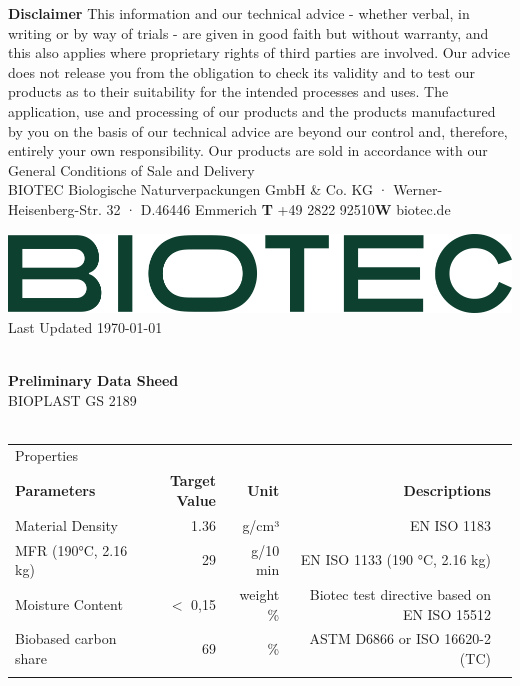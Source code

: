 \documentclass{article}
\begin{document}
\vspace*{\fill}
{\scriptsize
    \textbf{Disclaimer} This information and our technical advice - whether verbal, in writing or by way of trials - are given in good faith but without warranty, and this also applies where proprietary rights of third parties are involved. Our advice does not release you from the obligation to check its validity and to test our products as to their suitability for the intended processes and uses. The application, use and processing of our products and the products manufactured by you on the basis of our technical advice are beyond our control and, therefore, entirely your own responsibility. Our products are sold in accordance with our General Conditions of Sale and Delivery \\ 
 BIOTEC Biologische Naturverpackungen GmbH \& Co. KG · Werner-Heisenberg-Str. 32 · D.46446 Emmerich \hfill \textbf{T} +49 2822 92510\qquad \textbf{W} biotec.de}
\clearpage
\begin{flushleft}
\includegraphics[scale=0.20]{biotec}
\hfill\tiny Last Updated \today
\end{flushleft}
\begin{flushleft}
\hspace{1cm}\\
\textbf{Preliminary Data Sheed}\\
BIOPLAST GS 2189\\
\hspace{1cm}\\
\end{flushleft}
\begin{center}
\begin{tabularx}
{\textwidth}{X r  r  r  r }\rowcolor{color_title}Properties &  &  &  &  \\
\textbf{Parameters} & \textbf{Target Value} & \textbf{Unit} & \textbf{Descriptions} &  \\
Material Density  & 1.36 & g/cm³ & EN ISO 1183 &  \\
\arrayrulecolor{line_color}\hline
MFR (190°C, 2.16 kg) & 29 & g/10 min & EN ISO 1133 (190 °C, 2.16 kg) &  \\
\arrayrulecolor{line_color}\hline
Moisture Content & \(<\) 0,15 & weight \% & Biotec test directive based on EN ISO 15512 &  \\
\arrayrulecolor{line_color}\hline
Biobased carbon share & 69 & \% & ASTM D6866 or ISO 16620-2 (TC) &  \\
\arrayrulecolor{line_color}\hline

\end{tabularx}
\end{center}
\end{document}
